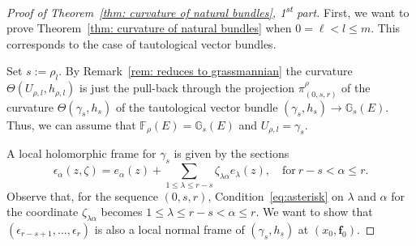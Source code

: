 \documentclass[a4paper]{amsart}
\theoremstyle{plain}%
\theoremstyle{definition}
\theoremstyle{remark}
\newcommand{\GG}{\mathbb{G}}
\newcommand{\FF}{\mathbb{F}}
\begin{document}
\begin{proof}[Proof of Theorem~\ref{thm: curvature of natural bundles}, 1\textsuperscript{st} part]
	First, we want to prove Theorem~\ref{thm: curvature of natural bundles} when $ 0 = \ell < l \le m $.
	This corresponds to the case of tautological vector bundles.
	
	Set $ s := \rho_l $.
	By Remark~\ref{rem: reduces to grassmannian} the curvature $ \Theta(U_{\rho,l}, h_{\rho,l}) $ is just the pull-back through the projection $ \pi_{(0,s,r)}^{\rho} $ of the curvature $ \Theta(\gamma_{s}, h_s) $ of the tautological vector bundle $ (\gamma_{s}, h_s) \to \GG_{s}(E) $.
	Thus, we can assume that $ \FF_{\rho}(E) = \GG_{s}(E) $ and $ U_{\rho,l} = \gamma_{s} $.
	
	A local holomorphic frame for $ \gamma_{s} $ is given by the sections
	\begin{equation*}
		\epsilon_\alpha (z,\zeta) = e_\alpha(z) + \sum_{1 \le \lambda \le r-s} \zeta_{\lambda\alpha} e_\lambda(z) , \quad \text{for} \ r-s < \alpha \le r .
	\end{equation*}
	Observe that, for the sequence $ (0,s,r) $, Condition~\eqref{eq:asterisk} on $ \lambda $ and $ \alpha $ for the coordinate $ \zeta_{\lambda\alpha} $ becomes $ 1 \le \lambda \le r-s < \alpha \le r $.
	We want to show that $ (\epsilon_{r-s+1},\dots,\epsilon_r) $ is also a local normal frame of $ (\gamma_{s},h_s) $ at $ (x_0,\mathbf{f}_0) $.
	

\end{proof}
\end{document}
